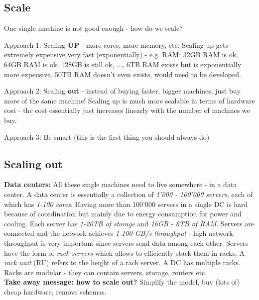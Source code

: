 \documentclass[11pt,oneside,a4paper]{article}
\begin{document}
\subsection{Scale}

One single machine is not good enough - how do we scale?

\begin{compactitem}
	\item Approach 1: Scaling \textbf{UP} - more cores, more memory, etc. Scaling up gets extremely expensive very fast (exponentially) - e.g. RAM: 32GB RAM is ok, 64GB RAM is ok, 128GB is still ok, ..., 6TB RAM exists but is exponentially more expensive. 50TB RAM doesn't even exists, would need to be developed.
	\item Approach 2: Scaling \textbf{out} - instead of buying faster, bigger machines, just buy more of the same machine! Scaling up is much more scalable in terms of hardware cost - the cost essentially just increases linearly with the number of machines we buy.
	\item Approach 3: Be smart (this is the first thing you should always do)\\
\end{compactitem}

\subsection{Scaling out}

\textbf{Data centers:} All these single machines need to live somewhere - in a data center. A data center is essentially a collection of \textit{1'000 - 100'000 servers}, each of which has \textit{1-100 cores}. Having more than 100'000 servers in a single DC is hard because of coordination but mainly due to energy consumption for power and cooling. Each server has \textit{1-20TB of storage} and \textit{16GB - 6TB of RAM}. Servers are connected and the network achieves \textit{1-100 GB/s throughput} - high network throughput is very important since servers send data among each other. Servers have the form of \textit{rack servers} which allows to efficiently stack them in racks. A \textit{rack unit} (RU) refers to the height of a rack server. A DC has multiple racks. Racks are modular - they can contain servers, storage, routers etc.\\

\textbf{Take away message: how to scale out?} Simplify the model, buy (lots of) cheap hardware, remove schemas.

\newpage
\end{document}

